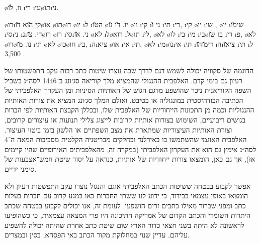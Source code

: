 \o{וו}, \u{לו}  \i{רי} \i{עי}\o{תו}\i{ני}.

 \o{רו}\i{קי} \u{הוא}  \u{דו}\o{או} \o{תו}\o{דו} \o{יו} \i{ל}  \i{ה}\u{טו} \o{יו}. \u{דו} \u{נו} \o{וו} \i{קי} \i{ני} \u{ו} \i{תי} \i{רי},  \i{קי}  \o{יו}  \i{שי} ,  \o{יו}  \i{שי}\u{מו} \i{סי}\i{ני} \i{נ}\i{די},  \u{צו}\o{רו}   \o{רו} \i{סי}\i{ני}. \u{או}  \o{לא}  \i{ל}\o{רוא} \i{ל}\o{תו} \i{לי}, \o{לא}  \o{לו} \i{בי} \i{מי}  \i{בי}\o{בו} \u{שו} \i{די}  \i{פ},  \o{לא}  \o{רו}\o{נו}.   \u{מו} \i{תי} \o{לא}  \o{כו}\o{חו} \i{בי},  \i{ה}\i{ציא} \o{או} \i{אי}  \i{תי}, \o{לא}  \i{מי}\o{נו}\i{אי}  \i{תי} \i{די}\u{מו}\u{הו} \i{ה}\i{צי}\u{או}  \i{תי}  \i{ל} 3,500 .

הדוגמה של סקוויה יכולה לשמש דגם לדרך שבה נוצרו שיטות כתב רבות עקב התפשטותו של רעיון גם בימי קדם. האלפבית ההנגולי שהמציא מלך קוריאה סג׳ונג ב־1446 לסה״נ בשביל השפה הקוריאנית ניכר שהושפע מדגם הגוש של האותיות הסיניות ומן העקרון האלפביתי של הכתיבה הבודהיסטית במונגוליה או בטיבט. ואולם המלך סג׳ונג המציא את צורות האותיות ההנגוליות וכמה מן התכונות הייחודיות של האלפבית שלו, ובכללן הקבצת האותיות לפי הברות בגושים ריבועיים, השימוש בצורות אותיות קרובות לייצוג צלילי תנועות או עיצורים קרובים, וצורת האותיות העיצוריות שמתארת את מצב השפתיים או הלשון בזמן ביטוי העיצור. האלפבית האוגמי שהשתמשו בו באירלנד ובחלקים מבריטניה הקלטית מסביבות המאה ה־4 לסה״נ אימץ גם הוא את העקרון האלפביתי (במקרה זה, מהאלפביתים האירופיים שהיו קיימים אז), אך גם כאן, הומצאו צורות ייחודיות של אותיות, כנראה על יסוד שיטת חמש־אצבעות של סימני ידיים.

אפשר לקבוע בבטחה ששיטות הכתב האלפביתי אוגם והנגול נוצרו עקב התפשטות רעיון ולא הומצאו באופן עצמאי בבידוד, כי ידוע לנו ששתי החברות באו במגע קרוב עם חברות בעלות כתב ומפני שברור מאילו כתבים זרים הושפעו. לעומת זה, אנו יכולים לקבוע בבטחה שכתב היתדות השומרי והכתב הקדום של אמריקה התיכונה היו פרי המצאה עצמאית, כי כשהופיעו לראשונה לא היתה בשני חצאי כדור הארץ שום שיטת כתב אחרת שהיתה יכולה להשפיע עליהם. עדיין שנוי במחלוקת מקור הכתב באי הפסחא, בסין ובמצרים.
